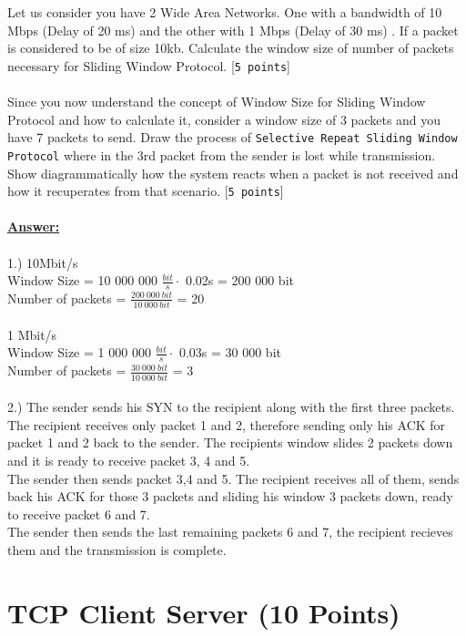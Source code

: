 \documentclass{scrartcl}
\begin{document}
Let us consider you have 2 Wide Area Networks. One with a bandwidth of 10 Mbps (Delay of 20 ms) and the other with 1 Mbps (Delay of 30 ms) . If a packet is considered to be of size 10kb. Calculate the window size of number of packets necessary for Sliding Window Protocol. [\texttt{5 points}]\\ \\
Since you now understand the concept of Window Size for Sliding Window Protocol and how to calculate it, consider a window size of 3 packets and you have 7 packets to send. Draw the process of \texttt{Selective Repeat Sliding Window Protocol} where in the 3rd packet from the sender is lost while transmission. Show diagrammatically how the system reacts when a packet is not received and how it recuperates from that scenario. [\texttt{5 points}] \\
\\
\textbf{\underline{Answer:}}\\
\\
1.) 10Mbit/s\\ 
Window Size = 10 000 000 $\frac{bit}{s} \cdot$ 0.02s = 200 000 bit\\
Number of packets = $\frac{200~000~bit}{10~000~bit}$ = 20\\
\\
1 Mbit/s\\
Window Size = 1 000 000 $\frac{bit}{s} \cdot$ 0.03s = 30 000 bit\\
Number of packets = $\frac{30~000~bit}{10~000~bit}$ = 3\\
\\
2.) The sender sends his SYN to the recipient along with the first three packets. \\
The recipient receives only packet 1 and 2, therefore sending only his ACK for packet 1 and 2 back to the sender. The recipients window slides 2 packets down and it is ready to receive packet 3, 4 and 5.\\
The sender then sends packet 3,4 and 5. The recipient receives all of them, sends back his ACK for those 3 packets and sliding his window 3 packets down, ready to receive packet 6 and 7.\\
The sender then sends the last remaining packets 6 and 7, the recipient recieves them and the transmission is complete.


\section{TCP Client Server (10 Points)}
\end{document}
